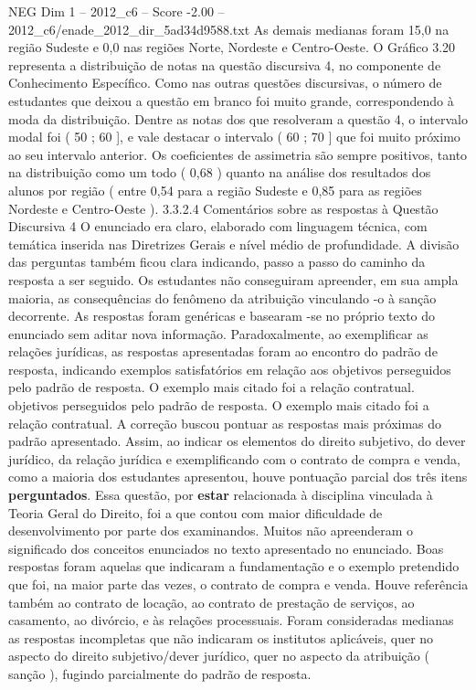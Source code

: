 \begin{textsample}{NEG Dim 1 – 2012\_c6 – Score -2.00 – 2012\_c6/enade\_2012\_dir\_5ad34d9588.txt}
As demais medianas foram 15,0 na região Sudeste e 0,0 nas regiões Norte, Nordeste e Centro-Oeste.
O Gráfico 3.20 representa a distribuição de notas na questão discursiva 4, no componente de Conhecimento Específico.
Como nas outras questões discursivas, o número de estudantes que deixou a questão em branco foi muito grande, correspondendo à moda da distribuição.
Dentre as notas dos que resolveram a questão 4, o intervalo modal foi ( 50 ; 60 ], e vale destacar o intervalo ( 60 ; 70 ] que foi muito próximo ao seu intervalo anterior.
Os coeficientes de assimetria são sempre positivos, tanto na distribuição como um todo ( 0,68 ) quanto na análise dos resultados dos alunos por região ( entre 0,54 para a região Sudeste e 0,85 para as regiões Nordeste e Centro-Oeste ). 3.3.2.4 Comentários sobre as respostas à Questão Discursiva 4 O enunciado era claro, elaborado com linguagem técnica, com temática inserida nas Diretrizes Gerais e nível médio de profundidade.
A divisão das perguntas também ficou clara indicando, passo a passo do caminho da resposta a ser seguido.
Os estudantes não conseguiram apreender, em sua ampla maioria, as consequências do fenômeno da atribuição vinculando -o à sanção decorrente.
As respostas foram genéricas e basearam -se no próprio texto do enunciado sem aditar nova informação.
Paradoxalmente, ao exemplificar as relações jurídicas, as respostas apresentadas foram ao encontro do padrão de resposta, indicando exemplos satisfatórios em relação aos objetivos perseguidos pelo padrão de resposta.
O exemplo mais citado foi a relação contratual. objetivos perseguidos pelo padrão de resposta.
O exemplo mais citado foi a relação contratual.
A correção buscou pontuar as respostas mais próximas do padrão apresentado.
Assim, ao indicar os elementos do direito subjetivo, do dever jurídico, da relação jurídica e exemplificando com o contrato de compra e venda, como a maioria dos estudantes apresentou, houve pontuação parcial dos três itens \textbf{perguntados}.
Essa questão, por \textbf{estar} relacionada à disciplina vinculada à Teoria Geral do Direito, foi a que contou com maior dificuldade de desenvolvimento por parte dos examinandos.
Muitos não apreenderam o significado dos conceitos enunciados no texto apresentado no enunciado.
Boas respostas foram aquelas que indicaram a fundamentação e o exemplo pretendido que foi, na maior parte das vezes, o contrato de compra e venda.
Houve referência também ao contrato de locação, ao contrato de prestação de serviços, ao casamento, ao divórcio, e às relações processuais.
Foram consideradas medianas as respostas incompletas que não indicaram os institutos aplicáveis, quer no aspecto do direito subjetivo/dever jurídico, quer no aspecto da atribuição ( sanção ), fugindo parcialmente do padrão de resposta.

\end{textsample}
